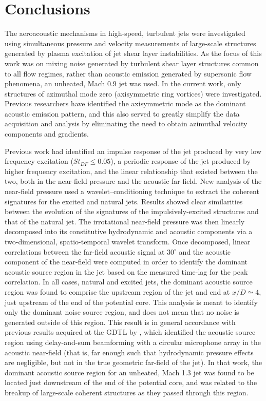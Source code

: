 \section{Conclusions}
The aeroacoustic mechanisms in high-speed, turbulent jets were investigated using simultaneous pressure and velocity measurements of large-scale structures generated by plasma excitation of jet shear layer instabilities.
As the focus of this work was on mixing noise generated by turbulent shear layer structures common to all flow regimes, rather than acoustic emission generated by supersonic flow phenomena, an unheated, Mach 0.9 jet was used.
In the current work, only structures of azimuthal mode zero (axisymmetric ring vortices) were investigated. Previous researchers have identified the axisymmetric mode as the dominant acoustic emission pattern, and this also served to greatly simplify the data acquisition and analysis by eliminating the need to obtain azimuthal velocity components and gradients.

Previous work had identified an impulse response of the jet produced by very low frequency excitation ($St_{DF} \leq 0.05$), a periodic response of the jet produced by higher frequency excitation, and the linear relationship that existed between the two, both in the near-field pressure and the acoustic far-field.
New analysis of the near-field pressure used a wavelet--conditioning technique to extract the coherent signatures for the excited and natural jets.
Results showed clear similarities between the evolution of the signatures of the impulsively-excited structures and that of the natural jet.
The irrotational near-field pressure was then linearly decomposed into its constitutive hydrodynamic and acoustic components via a two-dimensional, spatio-temporal wavelet transform.
Once decomposed, linear correlations between the far-field acoustic signal at $30^\circ$ and the acoustic component of the near-field were computed in order to identify the dominant acoustic source region in the jet based on the measured time-lag for the peak correlation.
In all cases, natural and excited jets, the dominant acoustic source region was found to comprise the upstream region of the jet and end at $x/D \simeq 4$, just upstream of the end of the potential core.
This analysis is meant to identify only the dominant noise source region, and does not mean that no noise is generated outside of this region.
This result is in general accordance with previous results acquired at the GDTL by \citet{Hileman2005}, which identified the acoustic source region using delay-and-sum beamforming with a circular microphone array in the acoustic near-field (that is, far enough such that hydrodynamic pressure effects are negligible, but not in the true geometric far-field of the jet).
In that work, the dominant acoustic source region for an unheated, Mach 1.3 jet was found to be located just downstream of the end of the potential core, and was related to the breakup of large-scale coherent structures as they passed through this region.

